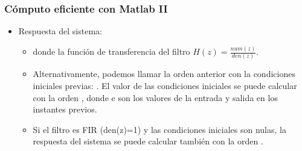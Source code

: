 \begin{frame}
\frametitle{Cómputo eficiente  con Matlab II}

\footnotesize
\begin{itemize}

\item Respuesta del sistema:

\begin{itemize}
\footnotesize
\item  {} \color{black} donde la función de transferencia del filtro $H(z)=\frac{num(z)}{den(z)}$.

\vspace{0.2cm}

\item Alternativamente, podemos llamar la orden anterior con la condiciones iniciales  \color{black} previas:  \color{black}. El valor de las condiciones iniciales se puede calcular con la orden  \color{black}, donde  \color{black} e  \color{black} son los valores de la entrada y salida en los instantes previos.

\vspace{0.2cm}

\item Si el filtro es FIR (den(z)=1) y las condiciones iniciales son nulas, la respuesta del sistema se puede calcular también con la orden \color{black}.


\end{itemize}

\end{itemize}

\end{frame}

